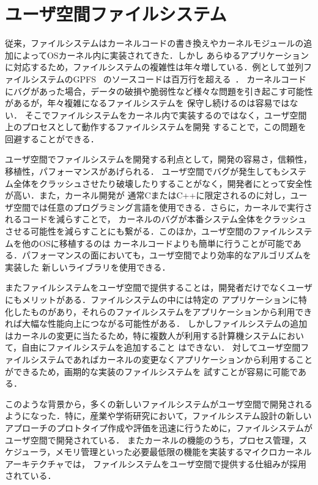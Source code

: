 \documentclass[a4paper,11pt]{jreport}
\begin{document}
\section{ユーザ空間ファイルシステム}
従来，ファイルシステムはカーネルコードの書き換えやカーネルモジュールの追加によってOSカーネル内に実装されてきた．しかし
あらゆるアプリケーションに対応するため，ファイルシステムの複雑性は年々増している．例として並列ファイルシステムのGPFS~\cite{270722}
のソースコードは百万行を超える~\cite{3149376}．
カーネルコードにバグがあった場合，データの破損や脆弱性など様々な問題を引き起こす可能性があるが，年々複雑になるファイルシステムを
保守し続けるのは容易ではない．
そこでファイルシステムをカーネル内で実装するのではなく，ユーザ空間上のプロセスとして動作するファイルシステムを開発
することで，この問題を回避することができる．

ユーザ空間でファイルシステムを開発する利点として，開発の容易さ，信頼性，移植性，パフォーマンスがあげられる．
ユーザ空間でバグが発生してもシステム全体をクラッシュさせたり破壊したりすることがなく，開発者にとって安全性が高い．また，カーネル開発が
通常CまたはC++に限定されるのに対し，ユーザ空間では任意のプログラミング言語を使用できる．さらに，カーネルで実行されるコードを減らすことで，
カーネルのバグが本番システム全体をクラッシュさせる可能性を減らすことにも繋がる．このほか，ユーザ空間のファイルシステムを他のOSに移植するのは
カーネルコードよりも簡単に行うことが可能である．パフォーマンスの面においても，ユーザ空間でより効率的なアルゴリズムを実装した
新しいライブラリを使用できる．

またファイルシステムをユーザ空間で提供することは，開発者だけでなくユーザにもメリットがある．ファイルシステムの中には特定の
アプリケーションに特化したものがあり，それらのファイルシステムをアプリケーションから利用できれば大幅な性能向上につながる可能性がある．
しかしファイルシステムの追加はカーネルの変更に当たるため，特に複数人が利用する計算機システムにおいて，自由にファイルシステムを追加すること
はできない．
対してユーザ空間ファイルシステムであればカーネルの変更なくアプリケーションから利用することができるため，画期的な実装のファイルシステムを
試すことが容易に可能である．

このような背景から，多くの新しいファイルシステムがユーザ空間で開発されるようになった．特に，産業や学術研究において，ファイルシステム設計の新しいアプローチのプロトタイプ作成や評価を迅速に行うために，ファイルシステムが
ユーザ空間で開発されている．
またカーネルの機能のうち，プロセス管理，スケジューラ，メモリ管理といった必要最低限の機能を実装するマイクロカーネルアーキテクチャでは，
ファイルシステムをユーザ空間で提供する仕組みが採用されている．
\end{document}

